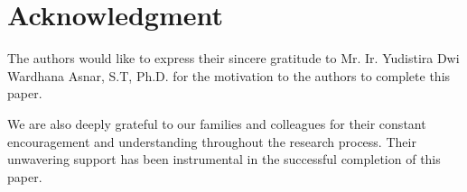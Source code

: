 \section*{Acknowledgment}

The authors would like to express their sincere gratitude to Mr. Ir. Yudistira Dwi Wardhana Asnar, S.T, Ph.D. for the motivation to the authors to complete this paper.

We are also deeply grateful to our families and colleagues for their constant encouragement and understanding throughout the research process. Their unwavering support has been instrumental in the successful completion of this paper.

